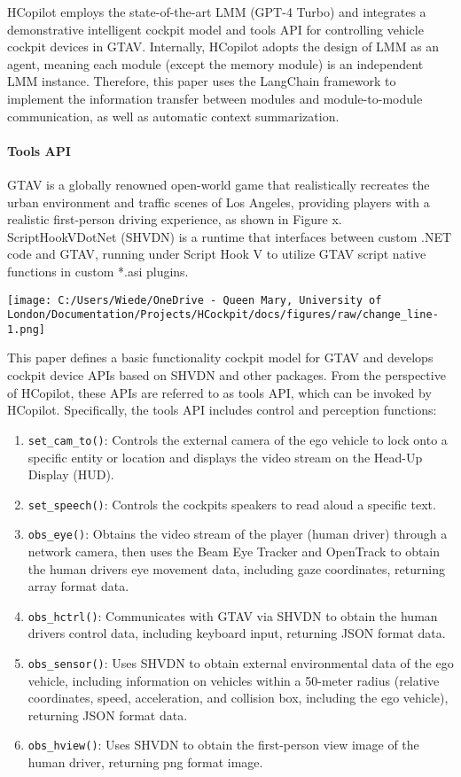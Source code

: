 \documentclass[
]{article}
\begin{document}
HCopilot employs the state-of-the-art LMM (GPT-4 Turbo) and integrates a
demonstrative intelligent cockpit model and tools API for controlling
vehicle cockpit devices in GTAV. Internally, HCopilot adopts the design
of LMM as an agent, meaning each module (except the memory module) is an
independent LMM instance. Therefore, this paper uses the LangChain
framework to implement the information transfer between modules and
module-to-module communication, as well as automatic context
summarization.

\paragraph{Tools API}\label{tools-api}

GTAV is a globally renowned open-world game that realistically recreates
the urban environment and traffic scenes of Los Angeles, providing
players with a realistic first-person driving experience, as shown in
Figure x. ScriptHookVDotNet (SHVDN) is a runtime that interfaces between
custom .NET code and GTAV, running under Script Hook V to utilize GTAV
script native functions in custom *.asi plugins.

\texttt{[image: C:/Users/Wiede/OneDrive - Queen Mary, University of London/Documentation/Projects/HCockpit/docs/figures/raw/change\_line-1.png]}

This paper defines a basic functionality cockpit model for GTAV and
develops cockpit device APIs based on SHVDN and other packages. From the
perspective of HCopilot, these APIs are referred to as tools API, which
can be invoked by HCopilot. Specifically, the tools API includes control
and perception functions:

\begin{enumerate}
\def\labelenumi{\arabic{enumi}.}
\item
  \texttt{set\_cam\_to()}: Controls the external camera of the ego
  vehicle to lock onto a specific entity or location and displays the
  video stream on the Head-Up Display (HUD).
\item
  \texttt{set\_speech()}: Controls the cockpit\textquotesingle s
  speakers to read aloud a specific text.
\item
  \texttt{obs\_eye()}: Obtains the video stream of the player (human
  driver) through a network camera, then uses the Beam Eye Tracker and
  OpenTrack to obtain the human driver\textquotesingle s eye movement
  data, including gaze coordinates, returning array format data.
\item
  \texttt{obs\_hctrl()}: Communicates with GTAV via SHVDN to obtain the
  human driver\textquotesingle s control data, including keyboard input,
  returning JSON format data.
\item
  \texttt{obs\_sensor()}: Uses SHVDN to obtain external environmental
  data of the ego vehicle, including information on vehicles within a
  50-meter radius (relative coordinates, speed, acceleration, and
  collision box, including the ego vehicle), returning JSON format data.
\item
  \texttt{obs\_hview()}: Uses SHVDN to obtain the first-person view
  image of the human driver, returning png format image.
\end{enumerate}
\end{document}
